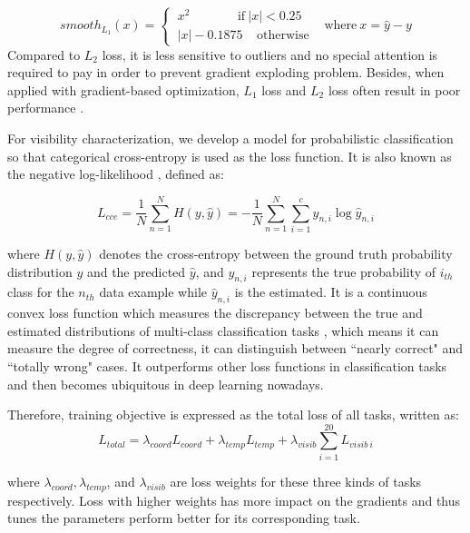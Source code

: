 \documentclass[a4paper,12pt]{article}
\begin{document}
\begin{equation}
\label{eq10}
smooth_{L_1}(x) =
\begin{cases}
~x^2 ~~~~~~~~~~~~~~~~~\text{if} ~\left | x \right |< 0.25 & \\    
~\left | x \right | - 0.1875 ~~~~~\text{otherwise}   
\end{cases} 
\text{where}  ~ x=\widehat{y} - y
\end{equation}
Compared to $L_2$ loss, it is less sensitive to outliers and no special attention is required to pay in order to prevent gradient exploding problem\cite{DBLP:journals/corr/Girshick15}. Besides, when applied with gradient-based optimization, $L_1$ loss and $L_2$ loss often result in poor performance \cite{Goodfellow-et-al-2016}.

For visibility characterization, we develop a model for probabilistic classification so that categorical cross-entropy is used as the loss function. It is also known as the negative log-likelihood \cite{Goodfellow-et-al-2016}, defined as:

\begin{equation}
\label{eq11}
L_{cce} =\frac{1}{N} \sum_{n=1}^N H(y,\widehat{y}) = -\frac{1}{N}\sum_{n=1}^N \sum_{i=1}^c y_{n,i} \log \widehat{y}_{n,i}
\end{equation}

where $H(y, \widehat{y})$ denotes the cross-entropy between the ground truth probability distribution $y$ and the predicted $\widehat{y}$, and $y_{n,i} $ represents the true probability of $i_{th}$ class for the $n_{th}$ data example while $\widehat{y}_{n,i}$ is the estimated. It is a continuous convex loss function which measures the discrepancy between the true and estimated distributions of multi-class classification tasks \cite{DBLP:journals/corr/abs-1802-09941}, which means it can measure the degree of correctness, \ie it can distinguish between ``nearly correct" and ``totally wrong" cases. It outperforms other loss functions in classification tasks and then becomes ubiquitous in deep learning nowadays.

Therefore, training objective is expressed as the total loss of all tasks, written as:
\begin{equation}
\label{eq12}
L_{total} = \lambda_{coord} L_{coord} + \lambda_{temp} L_{temp} + \lambda_{visib}\sum_{i=1}^{20} L_{visib~i}
\end{equation}

where $\lambda_{coord}, \lambda_{temp}$, and $\lambda_{visib}$ are loss weights for these three kinds of tasks respectively. Loss with higher weights has more impact on the gradients and thus tunes the parameters perform better for its corresponding task.
\end{document}
